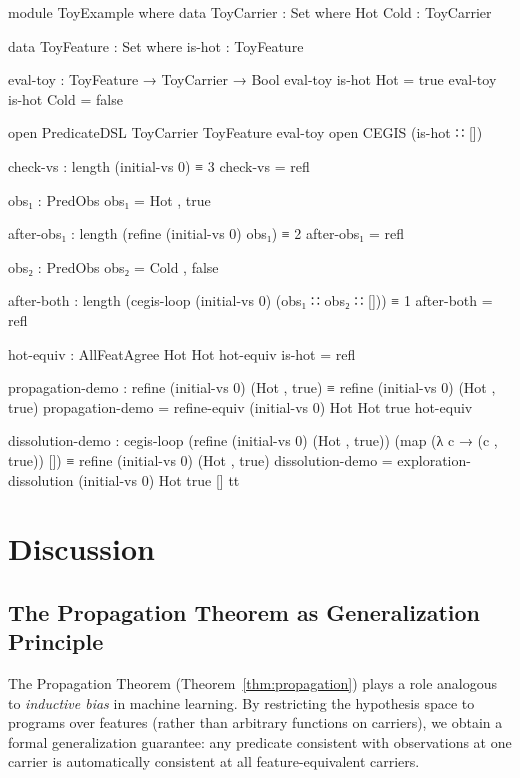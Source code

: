 \documentclass[9pt,a4paper]{article}
\theoremstyle{plain}
\theoremstyle{definition}
\theoremstyle{remark}
\begin{document}
\begin{code}[hide]
module ToyExample where
  data ToyCarrier : Set where
    Hot Cold : ToyCarrier

  data ToyFeature : Set where
    is-hot : ToyFeature

  eval-toy : ToyFeature → ToyCarrier → Bool
  eval-toy is-hot Hot  = true
  eval-toy is-hot Cold = false

  open PredicateDSL ToyCarrier ToyFeature eval-toy
  open CEGIS (is-hot ∷ [])

  check-vs : length (initial-vs 0) ≡ 3
  check-vs = refl

  obs₁ : PredObs
  obs₁ = Hot , true

  after-obs₁ : length (refine (initial-vs 0) obs₁) ≡ 2
  after-obs₁ = refl

  obs₂ : PredObs
  obs₂ = Cold , false

  after-both : length (cegis-loop (initial-vs 0) (obs₁ ∷ obs₂ ∷ [])) ≡ 1
  after-both = refl

  hot-equiv : AllFeatAgree Hot Hot
  hot-equiv is-hot = refl

  propagation-demo : refine (initial-vs 0) (Hot , true)
                   ≡ refine (initial-vs 0) (Hot , true)
  propagation-demo = refine-equiv (initial-vs 0) Hot Hot true hot-equiv

  dissolution-demo :
    cegis-loop (refine (initial-vs 0) (Hot , true))
               (map (λ c → (c , true)) [])
    ≡ refine (initial-vs 0) (Hot , true)
  dissolution-demo = exploration-dissolution (initial-vs 0) Hot true [] tt
\end{code}



\section{Discussion}

\subsection{The Propagation Theorem as Generalization Principle}

The Propagation Theorem (Theorem~\ref{thm:propagation}) plays a role analogous to \emph{inductive bias} in machine learning.  By restricting the hypothesis space to programs over features (rather than arbitrary functions on carriers), we obtain a formal generalization guarantee: any predicate consistent with observations at one carrier is automatically consistent at all feature-equivalent carriers.
\end{document}

